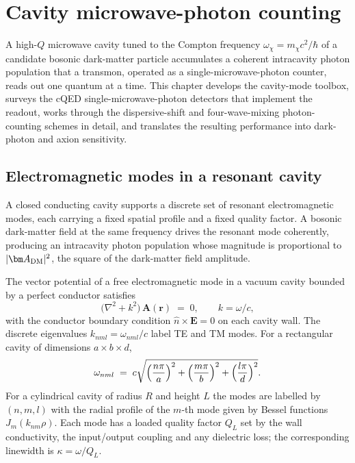 \chapter{Cavity microwave-photon counting}
\label{ch:microwave-absorption}

A high-$Q$ microwave cavity tuned to the Compton frequency
$\omega_\chi=m_\chi c^2/\hbar$ of a candidate bosonic dark-matter
particle accumulates a coherent intracavity photon population that
a transmon, operated as a single-microwave-photon counter, reads
out one quantum at a time. This chapter develops the cavity-mode
toolbox, surveys the cQED single-microwave-photon detectors that
implement the readout, works through the dispersive-shift and
four-wave-mixing photon-counting schemes in detail, and translates
the resulting performance into dark-photon and axion sensitivity.

\section{Electromagnetic modes in a resonant cavity}
\label{sec:cavity-modes}

\begin{phenomenon}
A closed conducting cavity supports a discrete set of resonant
electromagnetic modes, each carrying a fixed spatial profile and
a fixed quality factor. A bosonic dark-matter field at the same
frequency drives the resonant mode coherently, producing an
intracavity photon population whose magnitude is proportional to
$|\bm A_{\rm DM}|^2$, the square of the dark-matter field
amplitude.
\end{phenomenon}

\begin{statement}
\label{stmt:cavity-modes}
The vector potential of a free electromagnetic mode in a vacuum
cavity bounded by a perfect conductor satisfies
\begin{equation}
\label{eq:helmholtz-cavity}
\bigl(\nabla^2 + k^2\bigr)\,\bm A(\bm r) \;=\; 0,
\qquad k=\omega/c,
\end{equation}
with the conductor boundary condition $\hat n\times\bm E = 0$ on
each cavity wall. The discrete eigenvalues
$k_{nml}=\omega_{nml}/c$ label TE and TM modes. For a rectangular
cavity of dimensions $a\times b\times d$,
\begin{equation}
\label{eq:rect-cavity-modes}
\omega_{nml} \;=\; c\sqrt{\Bigl(\frac{n\pi}{a}\Bigr)^2 + \Bigl(\frac{m\pi}{b}\Bigr)^2 + \Bigl(\frac{l\pi}{d}\Bigr)^2}.
\end{equation}
For a cylindrical cavity of radius $R$ and height $L$ the modes
are labelled by $(n,m,l)$ with the radial profile of the $m$-th
mode given by Bessel functions $J_m(k_{nm}\rho)$. Each mode has
a loaded quality factor $Q_L$ set by the wall conductivity, the
input/output coupling and any dielectric loss; the corresponding
linewidth is $\kappa=\omega/Q_L$.
\end{statement}


